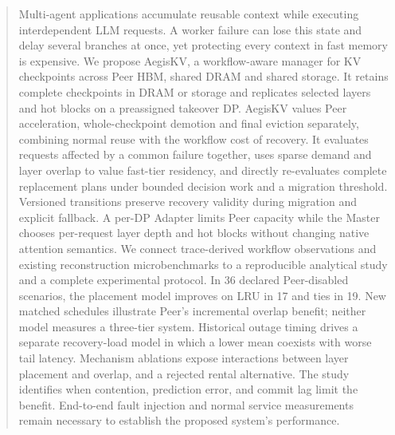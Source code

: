 \begin{abstract}
Multi-agent applications accumulate reusable context while executing
interdependent LLM requests. A worker failure can lose this state and delay
several branches at once, yet protecting every context in fast memory is
expensive. We propose AegisKV, a workflow-aware manager for KV checkpoints
across Peer HBM, shared DRAM and shared storage. It retains complete
checkpoints in DRAM or storage and replicates selected layers and hot
blocks on a preassigned takeover DP. AegisKV values Peer acceleration,
whole-checkpoint demotion and final eviction separately, combining normal reuse
with the workflow cost of recovery. It evaluates requests affected by a
common failure together, uses sparse demand and layer overlap to value
fast-tier residency, and directly re-evaluates complete replacement plans
under bounded decision work and a migration threshold.
Versioned transitions preserve recovery validity during migration and
explicit fallback. A per-DP Adapter limits Peer capacity while the Master
chooses per-request layer depth and hot blocks without changing native
attention semantics. We connect trace-derived
workflow observations and existing reconstruction microbenchmarks to a
reproducible analytical study and a complete experimental protocol.
In 36 declared Peer-disabled scenarios, the placement model improves on
LRU in 17 and ties in 19. New matched schedules illustrate Peer's
incremental overlap benefit; neither model measures a three-tier system. Historical outage timing drives a separate recovery-load model in which
a lower mean coexists with worse tail latency. Mechanism ablations expose
interactions between layer placement and overlap, and a rejected rental
alternative. The study identifies when contention, prediction error, and commit
lag limit the benefit. End-to-end fault injection and normal
service measurements remain necessary to establish the proposed system's
performance.
\end{abstract}
